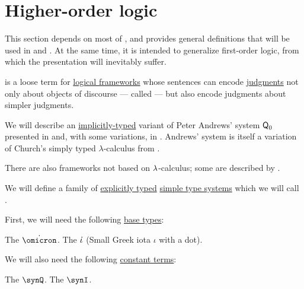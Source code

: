 \section{Higher-order logic}\label{sec:higher_order_logic}

This section depends on most of , and provides general definitions that will be used in  and . At the same time, it is intended to generalize first-order logic, from which the presentation will inevitably suffer.

\begin{concept}\label{con:higher_order_logic}
   is a loose term for \hyperref[def:logical_framework]{logical frameworks} whose sentences can encode \hyperref[con:judgment]{judgments} not only about objects of discourse --- called  --- but also encode judgments about simpler judgments.

  We will describe an \hyperref[con:explicit_and_implicit_typing]{implicitly-typed} variant of Peter Andrews' system \( \textsf{Q}_0 \) presented in \cite[\S 51]{Andrews2002STT} and, with some variations, in . Andrews' system is itself a variation of Church's simply typed \( \lambda \)-calculus from \cite{Church1940STT}.

  There are also frameworks not based on \( \mathrm{\lambda} \)-calculus; some are described by .
\end{concept}

\begin{definition}\label{def:simply_typed_hol}\mimprovised
  We will define a family of \hyperref[def:simple_type_system_style]{explicitly typed} \hyperref[def:simple_type_system]{simple type systems} which we will call .

  First, we will need the following \hyperref[def:simple_type]{base types}:
  \begin{thmenum}[series=def:simple_type_system/base]
     The  \( \synomicron \).
     The  \( \dot{\iota} \) (Small Greek iota \( \iota \) with a dot).
  \end{thmenum}

  We will also need the following \hyperref[def:lambda_term]{constant terms}:
  \begin{thmenum}
     The  \( \synQ \).
     The  \( \synI \).
  \end{thmenum}
\end{definition}
